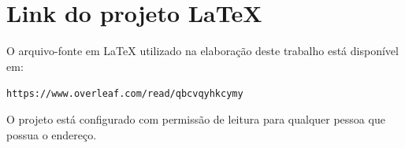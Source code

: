 \documentclass[12pt,a4paper]{article}
\begin{document}
\section{Link do projeto LaTeX}

O arquivo-fonte em \LaTeX{} utilizado na elaboração deste trabalho está disponível em:

\begin{center}
\large\texttt{https://www.overleaf.com/read/qbcvqyhkcymy}
\end{center}

\noindent O projeto está configurado com permissão de leitura para qualquer pessoa que
possua o endereço.

\printbibliography[title={Referências}]
\end{document}
